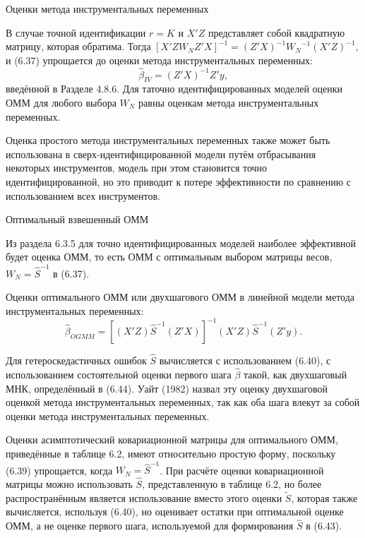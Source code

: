 \begin{center}
Оценки метода инструментальных переменных 
\end{center}

В случае точной идентификации $r=K$ и $X'Z$ представляет собой квадратную матрицу, которая обратима. Тогда $[X' Z W_N Z' X]^{-1}=(Z'X)^{-1} {W_N}^{-1} (X'Z)^{-1}$, и (6.37) упрощается до оценки метода инструментальных переменных:
\begin{equation}
\hat{\beta}_{IV}=(Z'X)^{-1} Z'y,
\end{equation}
введённой в Разделе 4.8.6. Для таточно идентифицированных моделей оценки ОММ для любого
выбора $W_N$ равны оценкам метода инструментальных переменных.

Оценка простого метода инструментальных переменных также может быть использована в сверх-идентифицированной модели путём отбрасывания некоторых инструментов, модель при этом становится точно идентифицированной, но это приводит к потере эффективности по сравнению с использованием всех инструментов.

\begin{center}
Оптимальный взвешенный ОММ
\end{center}

Из раздела 6.3.5 для точно идентифицированных моделей наиболее эффективной будет оценка ОММ,  то есть ОММ с оптимальным выбором матрицы весов, $W_N={\hat{S}}^{-1}$ в (6.37).

Оценки оптимального ОММ или двухшагового ОММ в линейной модели метода инструментальных переменных:
\begin{equation}
\hat{\beta}_{OGMM}=[(X'Z){\hat{S}}^{-1} (Z'X)]^{-1} (X'Z){\hat{S}}^{-1} (Z'y).
\end{equation}

Для гетероскедастичных ошибок $\hat{S}$ вычисляется с использованием (6.40), с использованием состоятельной оценки первого шага $\hat{\beta}$ такой, как двухшаговый МНК, определённый в (6.44). Уайт (1982) назвал эту оценку двухшаговой оценкой метода инструментальных переменных, так как оба шага влекут за собой оценки метода инструментальных переменных.

Оценки асимптотический ковариационной матрицы для оптимального ОММ, приведённые в таблице 6.2, имеют относительно простую форму, поскольку (6.39) упрощается, когда $W_N={\hat{S}}^{-1}$. При расчёте оценки ковариационной матрицы можно использовать $\hat{S}$, представленную в таблице 6.2, но более распространённым является использование вместо этого оценки $\tilde{S}$, которая также вычисляется, используя (6.40), но оценивает остатки при оптимальной оценке ОММ, а не оценке первого шага, используемой для формирования $\hat{S}$ в (6.43).

